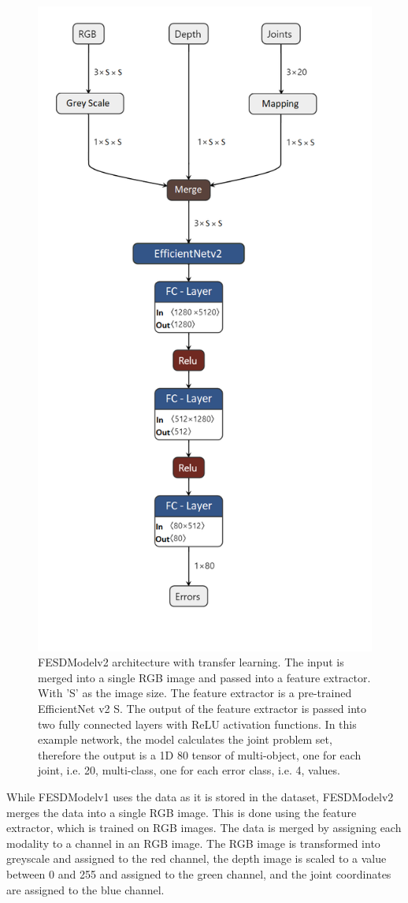 \begin{figure}[ht]
  \centering
  \includegraphics[width=.6\linewidth]{figures/Model/FESDv2.png}
  \caption[FESDModel architecture version 2]{FESDModelv2 architecture with transfer learning. The input is merged into a single RGB image and passed into a feature extractor. With 'S' as the image size. The feature extractor is a pre-trained EfficientNet v2 S. The output of the feature extractor is passed into two fully connected layers with ReLU activation functions. In this example network, the model calculates the joint problem set, therefore the output is a 1D 80 tensor of multi-object, one for each joint, i.e. 20, multi-class, one for each error class, i.e. 4, values.}
  \label{fig:model_architecture_v2}
\end{figure}

While FESDModelv1 uses the data as it is stored in the dataset, FESDModelv2 merges the data into a single RGB image. This is done using the feature extractor, which is trained on RGB images. The data is merged by assigning each modality to a channel in an RGB image. The RGB image is transformed into greyscale and assigned to the red channel, the depth image is scaled to a value between 0 and 255 and assigned to the green channel, and the joint coordinates are assigned to the blue channel.

